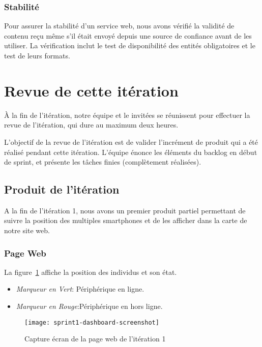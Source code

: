 \subsubsection{Stabilité}

Pour assurer la stabilité d'un service web, nous avons vérifié la validité de
contenu reçu même s'il était envoyé depuis une source de confiance avant de les
utiliser. La vérification inclut le test de disponibilité des entités
obligatoires et le test de leurs formats.

\section{Revue de cette itération}

À la fin de l'itération, notre équipe et le  invitées
se réunissent pour effectuer la revue de l'itération, qui dure au maximum deux
heures.

L'objectif de la revue de l'itération est de valider l'incrément de produit qui
a été réalisé pendant cette itération. L'équipe énonce les éléments du backlog
en début de sprint, et présente les tâches finies (complètement réalisées).

\subsection{Produit de l'itération}

A la fin de l'itération 1, nous avons un premier produit partiel permettant de
suivre la position des multiples smartphones et de les afficher dans la carte de
notre site web.

\subsubsection{Page Web }

La figure~\ref{fig:sprint1-dashboard-screenshot} affiche la position des
individus et son état.

\begin{itemize}
    \item \textit{Marqueur en Vert}: Périphérique en ligne.
    \item \textit{Marqueur en Rouge}:Périphérique en hors ligne.
\end{itemize}

\begin{figure}[H]
    \centering
    \texttt{[image: sprint1-dashboard-screenshot]}
    \caption{Capture écran de la page web de l'itération 1}
\label{fig:sprint1-dashboard-screenshot}
\end{figure}

